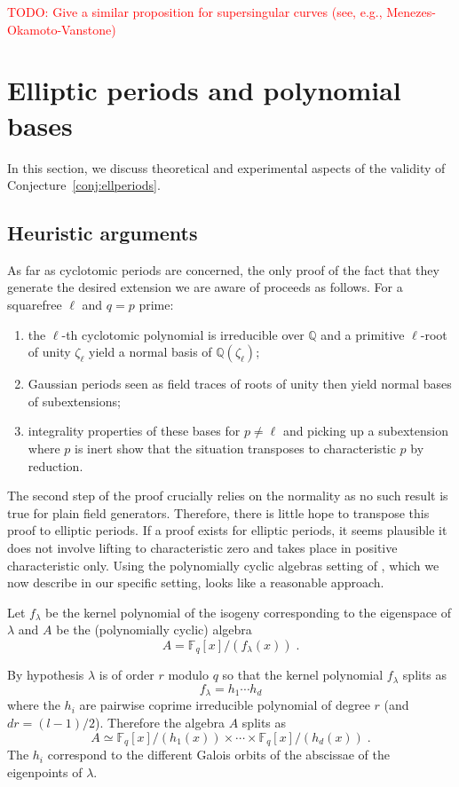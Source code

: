 \documentclass[12pt]{article}
\theoremstyle{plain}
\theoremstyle{definition}
\newcommand{\todo}[1]{\textcolor{red}{TODO: #1}}
\def\Q{\ensuremath{\mathbb{Q}}}
\def\F{\ensuremath{\mathbb{F}}}
\begin{document}
\todo{Give a similar proposition for supersingular curves (see, e.g.,
  Menezes-Okamoto-Vanstone)}

\section{Elliptic periods and polynomial bases}
\label{app:ellprdsdata}

In this section, we discuss theoretical and experimental aspects
of the validity of Conjecture~\ref{conj:ellperiods}.

\subsection{Heuristic arguments}

As far as cyclotomic periods are concerned,
the only proof of the fact that they generate the desired extension
we are aware of proceeds as follows.
For a squarefree $\ell$ and $q = p$ prime:
\begin{enumerate}
\item the $\ell$-th cyclotomic polynomial is irreducible over $\Q$ and
a primitive $\ell$-root of unity $\zeta_\ell$ yield a normal basis
of $\Q(\zeta_\ell)$;
\item Gaussian periods seen as field traces of roots of unity
then yield normal bases of subextensions;
\item integrality properties of these bases for $p \neq \ell$
and picking up a subextension where $p$ is inert show that
the situation transposes to characteristic $p$ by reduction.
\end{enumerate}
The second step of the proof crucially relies on the normality
as no such result is true for plain field generators.
Therefore, there is little hope to transpose this
proof to elliptic periods.
If a proof exists for elliptic periods,
it seems plausible it does not involve
lifting to characteristic zero and takes place in positive characteristic
only.
Using the polynomially cyclic algebras setting of \cite{Mihailescu2010825},
which we now describe in our specific setting,
looks like a reasonable approach.

Let $f_\lambda$ be the kernel polynomial of the isogeny corresponding
to the eigenspace of $\lambda$ and $A$ be the (polynomially cyclic)
algebra
\[
A = \F_q[x]/(f_\lambda(x)) \; .
\]

By hypothesis $\lambda$ is of order $r$ modulo $q$ so that
the kernel polynomial $f_\lambda$ splits as
\[
f_\lambda = h_1 \cdots h_d
\]
where the $h_i$ are pairwise coprime irreducible polynomial of degree $r$
(and $d r = (l-1)/2$).
Therefore the algebra $A$ splits as
\[
A \simeq \F_q[x]/(h_1(x)) \times \cdots \times \F_q[x]/(h_d(x)) \; .
\]
The $h_i$ correspond to the different Galois orbits of the abscissae
of the eigenpoints of $\lambda$.
\end{document}
